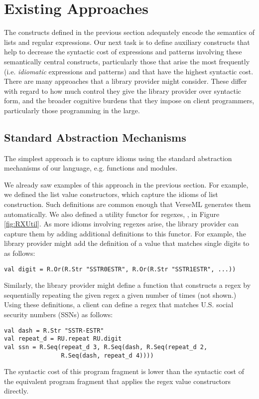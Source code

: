 \section{Existing Approaches}\label{sec:existing-approaches}
The constructs defined in the previous section adequately encode the semantics of lists and regular expressions. Our next task  is to define auxiliary constructs that help to decrease the syntactic cost of expressions and patterns involving these semantically central constructs, particularly those that arise the most frequently (i.e. \emph{idiomatic} expressions and patterns) and that have the highest syntactic cost. There are many approaches that a library provider might consider. These differ with regard to how much control they give the library provider over syntactic form, and the broader cognitive burdens that they impose on client programmers, particularly those  programming in the large.

\subsection{Standard Abstraction Mechanisms}
The simplest approach is to capture idioms using the standard abstraction mechanisms of our 
language, e.g. functions and modules. 

We already saw examples of this approach in the previous section. For example, we defined the list value constructors, which capture the idioms of list construction. Such definitions are common enough that VerseML generates them automatically. 
We also defined a utility functor for regexes, , in Figure \ref{fig:RXUtil}. As more idioms involving regexes arise, the library provider can capture them by adding additional definitions to this functor. For example, the library provider might add the definition of a value that matches single digits to  as follows:
\begin{lstlisting}[numbers=none]
val digit = R.Or(R.Str "SSTR0ESTR", R.Or(R.Str "SSTR1ESTR", ...))
\end{lstlisting}
Similarly, the library provider might define a function  that constructs a regex by sequentially repeating the given regex a given number of times (not shown.) 
Using these definitions, a client can define a regex that matches U.S. social security numbers (SSNs) as follows:
\begin{lstlisting}[numbers=none]
val dash = R.Str "SSTR-ESTR"
val repeat_d = RU.repeat RU.digit
val ssn = R.Seq(repeat_d 3, R.Seq(dash, R.Seq(repeat_d 2, 
                R.Seq(dash, repeat_d 4))))
\end{lstlisting}
The syntactic cost of this program fragment is lower than the syntactic cost of the equivalent program fragment that applies  the regex value constructors directly. 

